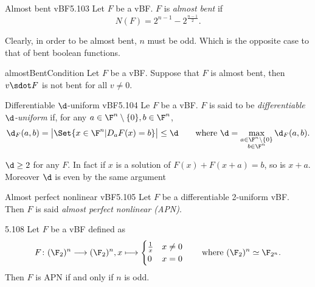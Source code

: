 \begin{defn}{Almost bent vBF}{5.103}
	Let \(F\) be a vBF. \(F\) is \emph{almost bent} if
	\[
		N(F) = 2^{n-1}-2^{\frac{n-1}{2}}.
	\]
\end{defn}

\begin{oss}
	Clearly, in order to be almost bent, \(n\) must be odd. Which is the opposite case to that of bent boolean functions.
\end{oss}

\begin{prop}{}{almostBentCondition}
	Let \(F\) be a vBF. Suppose that \(F\) is almost bent, then \(v\sdot F\) is not bent for all \(v \neq 0\).
\end{prop}

\begin{defn}{Differentiable \(\d\)-uniform vBF}{5.104}
	Le \(F\) be a vBF. \(F\) is said to be \emph{differentiable \(\d\)-uniform} if, for any \(a\in \F^n\setminus\{0\},b \in \F^n\),
	\[
		\d_F(a,b) = \big\lvert\Set{x \in \F^n | D_a F(x) = b}\big\rvert \le \d \qquad\text{where }\d = \max_{\substack{a \in \F^n\setminus\{0\}\\b\in\F^n}} \d_F(a,b).
	\]
\end{defn}

\begin{oss}
	\(\d\ge 2\) for any \(F\). In fact if \(x\) is a solution of \(F(x)+F(x+a)=b\), so is \(x+a\). Moreover \(\d\) is even by the same argument
\end{oss}

\begin{defn}{Almost perfect nonlinear vBF}{5.105}
	Let \(F\) be a differentiable 2-uniform vBF. Then \(F\) is said \emph{almost perfect nonlinear (APN)}.
\end{defn}

\begin{prop}{}{5.108}
	Let \(F\) be a vBF defined as
	\[
		F\colon (\F_2)^n \longrightarrow (\F_2)^n, x \longmapsto
		\begin{cases}
			\frac{1}{x} & x\neq 0 \\
			0           & x = 0
		\end{cases}
		\qquad\text{where }(\F_2)^n \simeq \F_{2^n}.
	\]
	Then \(F\) is APN if and only if \(n\) is odd.
\end{prop}

